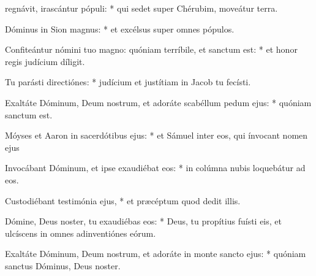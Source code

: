\begin{psalmus}
    
     regnávit, irascántur pópuli: * qui sedet super Chérubim, moveátur terra.
    
    Dóminus in Sion magnus: * et excélsus super omnes pópulos.
    
    Confiteántur nómini tuo magno: quóniam terríbile, et sanctum est: * et honor regis judícium díligit.
    
    Tu parásti directiónes: * judícium et justítiam in Jacob tu fecísti.
    
    Exaltáte Dóminum, Deum nostrum, et adoráte scabéllum pedum ejus: * quóniam sanctum est.
    
    Móyses et Aaron in sacerdótibus ejus: * et Sámuel inter eos, qui ínvocant nomen ejus
    
    Invocábant Dóminum, et ipse exaudiébat eos: * in colúmna nubis loquebátur ad eos.
    
    Custodiébant testimónia ejus, * et præcéptum quod dedit illis.
    
    Dómine, Deus noster, tu exaudiébas eos: * Deus, tu propítius fuísti eis, et ulcíscens in omnes adinventiónes eórum.
    
    Exaltáte Dóminum, Deum nostrum, et adoráte in monte sancto ejus: * quóniam sanctus Dóminus, Deus noster.
    
    \end{psalmus}
